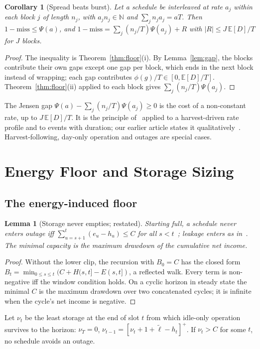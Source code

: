 \documentclass[lettersize,journal]{IEEEtran}
\newtheorem{lemma}{Lemma}
\newtheorem{corollary}{Corollary}
\theoremstyle{definition}
\theoremstyle{remark}
\newcommand{\Psif}{\Psi}
\newcommand{\lt}{\tilde{\ell}}
\newcommand{\E}{\mathbb{E}}
\begin{document}
\begin{corollary}[Spread beats burst]\label{cor:jensen}
Let a schedule be interleaved at rate $a_j$ within each block $j$ of length $n_j$, with $a_jn_j\in\mathbb{N}$ and $\sum_jn_ja_j=aT$. Then $1-\mathrm{miss}\le\Psif(a)$, and $1-\mathrm{miss}=\sum_j(n_j/T)\Psif(a_j)+R$ with $|R|\le J\,\E[D]/T$ for $J$ blocks.
\end{corollary}
\begin{proof}
The inequality is Theorem~\ref{thm:floor}(i). By Lemma~\ref{lem:gap}, the blocks contribute their own gaps except one gap per block, which ends in the next block instead of wrapping; each gap contributes $\phi(g)/T\in[0,\E[D]/T]$. Theorem~\ref{thm:floor}(ii) applied to each block gives $\sum_j(n_j/T)\Psif(a_j)$.
\end{proof}
\noindent The Jensen gap $\Psif(a)-\sum_j(n_j/T)\Psif(a_j)\ge0$ is the cost of a non-constant rate, up to $J\,\E[D]/T$. It is the principle of~\cite[Thm.~1]{kar2006ton} applied to a harvest-driven rate profile and to events with duration; our earlier article states it qualitatively~\cite{deep3_jiot2026}. Harvest-following, day-only operation and outages are special cases.

\section{Energy Floor and Storage Sizing}\label{sec:energy}
\subsection{The energy-induced floor}\label{sec:efloor}
\begin{lemma}[Storage never empties; restated]\label{lem:moser}
Starting full, a schedule never enters outage iff $\sum_{u=s+1}^t(e_u-h_u)\le C$ for all $s<t$~\cite[Thms.~4,5]{moser2007rts}; leakage enters as in~\cite[Eq.~8]{kansal2007}. The minimal capacity is the maximum drawdown of the cumulative net income.
\end{lemma}
\begin{proof}
Without the lower clip, the recursion with $B_0=C$ has the closed form $B_t=\min_{0\le s\le t}(C+H(s,t]-E(s,t])$, a reflected walk. Every term is non-negative iff the window condition holds. On a cyclic horizon in steady state the minimal $C$ is the maximum drawdown over two concatenated cycles; it is infinite when the cycle's net income is negative.
\end{proof}

Let $\nu_t$ be the least storage at the end of slot $t$ from which idle-only operation survives to the horizon: $\nu_T=0$, $\nu_{t-1}=[\nu_t+1+\lt-h_t]^+$. If $\nu_t>C$ for some $t$, no schedule avoids an outage.
\end{document}
